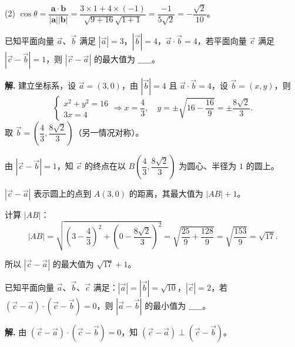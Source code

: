 \documentclass[11pt]{ctexrep}
\begin{document}
(2) $\cos\theta = \dfrac{\boldsymbol{a} \cdot \boldsymbol{b}}{|\boldsymbol{a}||\boldsymbol{b}|} = \dfrac{3 \times 1 + 4 \times (-1)}{\sqrt{9+16}\sqrt{1+1}} = \dfrac{-1}{5\sqrt{2}} = -\dfrac{\sqrt{2}}{10}$。

\begin{realexam}[2024 上海虹口二模]
    已知平面向量 $\overrightarrow{a}$、$\overrightarrow{b}$ 满足 $|\overrightarrow{a}| = 3$，$|\overrightarrow{b}| = 4$，$\overrightarrow{a} \cdot \overrightarrow{b} = 4$，若平面向量 $\overrightarrow{c}$ 满足 $|\overrightarrow{c} - \overrightarrow{b}| = 1$，则 $|\overrightarrow{c} - \overrightarrow{a}|$ 的最大值为 $\_\_\_\_\_$。
\end{realexam}

\textbf{解.} 建立坐标系，设 $\overrightarrow{a} = (3, 0)$，由 $|\overrightarrow{b}| = 4$ 且 $\overrightarrow{a} \cdot \overrightarrow{b} = 4$，设 $\overrightarrow{b} = (x, y)$，则
\[
    \begin{cases}
        x^2 + y^2 = 16 \\
        3x = 4
    \end{cases}
    \Rightarrow x = \dfrac{4}{3}, \quad y = \pm\sqrt{16-\dfrac{16}{9}} = \pm\dfrac{8\sqrt{2}}{3}.
\]
取 $\overrightarrow{b} = \left(\dfrac{4}{3}, \dfrac{8\sqrt{2}}{3}\right)$（另一情况对称）。

由 $|\overrightarrow{c} - \overrightarrow{b}| = 1$，知 $\overrightarrow{c}$ 的终点在以 $B\left(\dfrac{4}{3}, \dfrac{8\sqrt{2}}{3}\right)$ 为圆心、半径为 $1$ 的圆上。

$|\overrightarrow{c} - \overrightarrow{a}|$ 表示圆上的点到 $A(3, 0)$ 的距离，其最大值为 $|AB| + 1$。

计算 $|AB|$：
\[
    |AB| = \sqrt{\left(3-\dfrac{4}{3}\right)^2 + \left(0-\dfrac{8\sqrt{2}}{3}\right)^2} = \sqrt{\dfrac{25}{9} + \dfrac{128}{9}} = \sqrt{\dfrac{153}{9}} = \sqrt{17}.
\]

所以 $|\overrightarrow{c} - \overrightarrow{a}|$ 的最大值为 $\sqrt{17} + 1$。

\begin{realexam}[2024 上海长宁二模]
    已知平面向量 $\overrightarrow{a}$、$\overrightarrow{b}$、$\overrightarrow{c}$ 满足：$|\overrightarrow{a}| = |\overrightarrow{b}| = \sqrt{10}$，$|\overrightarrow{c}| = 2$，若 $(\overrightarrow{c} - \overrightarrow{a}) \cdot (\overrightarrow{c} - \overrightarrow{b}) = 0$，则 $|\overrightarrow{a} - \overrightarrow{b}|$ 的最小值为 $\_\_\_\_\_$。
\end{realexam}

\textbf{解.} 由 $(\overrightarrow{c} - \overrightarrow{a}) \cdot (\overrightarrow{c} - \overrightarrow{b}) = 0$，知 $(\overrightarrow{c} - \overrightarrow{a}) \perp (\overrightarrow{c} - \overrightarrow{b})$。
\end{document}
